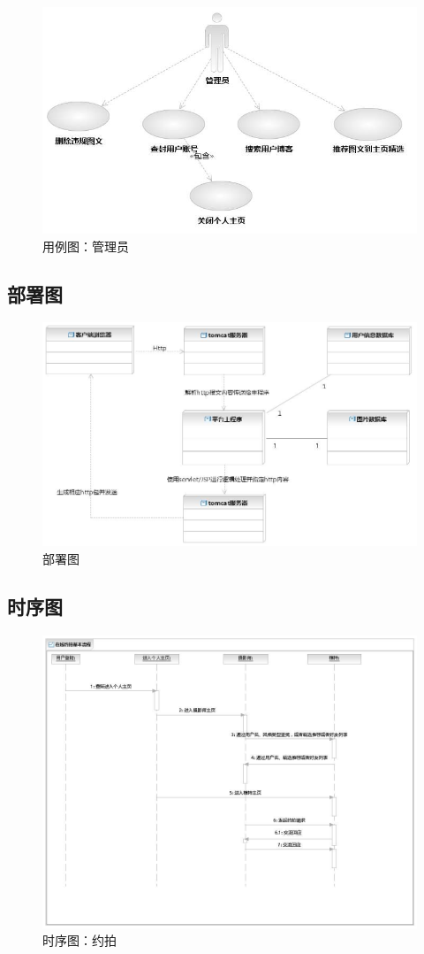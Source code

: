 \documentclass[a4paper,14pt]{ctexart}
\begin{document}
\begin{figure}[H]
\centering\includegraphics[width=4.5in]{用例图-管理员.jpeg}
\caption{用例图：管理员}
\end{figure}

\subsection{部署图}
\begin{figure}[H]
\centering\includegraphics[width=4.5in]{部署图.jpeg}
\caption{部署图}
\end{figure}

\subsection{时序图}

\begin{figure}[H]
\centering\includegraphics[width=4.5in]{时序图-约拍.jpeg}
\caption{时序图：约拍}
\end{figure}
\end{document}
